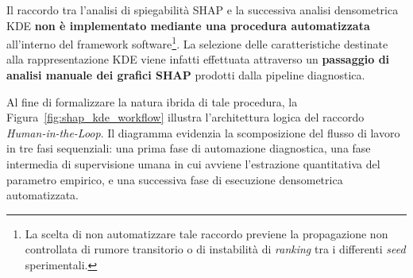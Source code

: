 Il raccordo tra l'analisi di spiegabilità SHAP e la successiva analisi densometrica KDE \textbf{non è implementato mediante una procedura automatizzata} all'interno del framework software\footnote{La scelta di non automatizzare tale raccordo previene la propagazione non controllata di rumore transitorio o di instabilità di \textit{ranking} tra i differenti \textit{seed} sperimentali.}. 
La selezione delle caratteristiche destinate alla rappresentazione KDE viene infatti effettuata attraverso un \textbf{passaggio di analisi manuale dei grafici SHAP} prodotti dalla pipeline diagnostica.

Al fine di formalizzare la natura ibrida di tale procedura, la Figura~\ref{fig:shap_kde_workflow} illustra l'architettura logica del raccordo \textit{Human-in-the-Loop}. Il diagramma evidenzia la scomposizione del flusso di lavoro in tre fasi sequenziali: una prima fase di automazione diagnostica, una fase intermedia di supervisione umana in cui avviene l'estrazione quantitativa del parametro empirico, e una successiva fase di esecuzione densometrica automatizzata.

